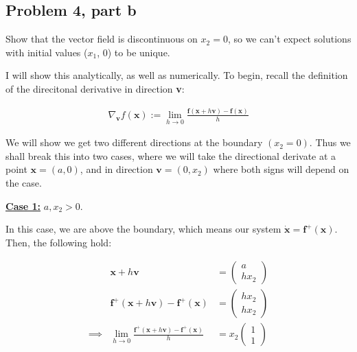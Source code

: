 \vspace{\floatsep}
\clearpage

\newpage
\subsection{Problem 4, part b}
Show that the vector field is discontinuous on $x_2 = 0$, so we can’t expect solutions with
initial values ($x_1$, 0) to be unique.

\partbreak
\begin{solution}
I will show this analytically, as well as numerically. To begin, recall the definition of the direcitonal derivative in direction \textbf{v}:

\alignbreak
\begin{align}
    \nabla_\textbf{v} f(\textbf{x}) := \lim_{h \rightarrow 0} \frac{\textbf{f}(\textbf{x} + h\textbf{v}) - \textbf{f}(\textbf{x})}{h} \label{p4b: directional derivative def}
\end{align}
\alignbreak

We will show we get two different directions at the boundary $(x_2 = 0)$. Thus we shall break this into two cases, where we will take the directional derivate at a point $\textbf{x} = (a, 0)$, and in direction $\textbf{v} = (0, x_2)$ where both signs will depend on the case.

\jump
\underline{\textbf{Case 1:}} $a, x_2 > 0$.
\jump

In this case, we are above the boundary, which means our system $\dot{\textbf{x}} = \textbf{f}^+(\textbf{x})$. Then, the following hold:

\alignbreak
\begin{align}
    &\textbf{x} + h\textbf{v} &= \begin{pmatrix} a\\hx_2\end{pmatrix}\nonumber\\
    &\textbf{f}^+(\textbf{x} + h\textbf{v}) - \textbf{f}^+(\textbf{x}) &= \begin{pmatrix} hx_2\\ hx_2\end{pmatrix}\nonumber\\
    \implies &\lim_{h \rightarrow 0} \frac{\textbf{f}^+(\textbf{x} + h\textbf{v}) - \textbf{f}^+(\textbf{x})}{h} &= x_2\begin{pmatrix}1\\1\end{pmatrix}\nonumber
\end{align}
\alignbreak


\end{solution}
